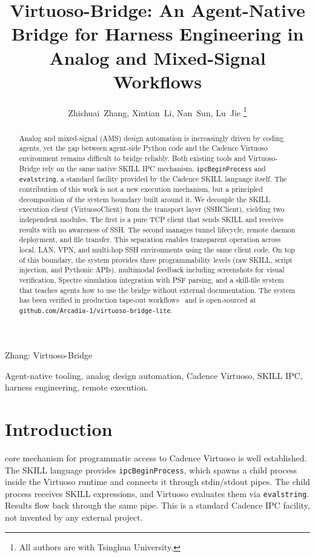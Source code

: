 \documentclass[lettersize,journal]{ieee_template/IEEEtran}
\begin{document}
\title{Virtuoso-Bridge: An Agent-Native Bridge for Harness Engineering in Analog and Mixed-Signal Workflows}

\author{Zhishuai~Zhang, Xintian~Li, Nan~Sun, Lu~Jie%
\thanks{All authors are with Tsinghua University.}%
}

\markboth{}%
{Zhang: Virtuoso-Bridge}

\maketitle

\begin{abstract}
Analog and mixed-signal (AMS) design automation is increasingly driven by coding agents, yet the gap between agent-side Python code and the Cadence Virtuoso environment remains difficult to bridge reliably. Both existing tools and Virtuoso-Bridge rely on the same native SKILL IPC mechanism, \texttt{ipcBeginProcess} and \texttt{evalstring}, a standard facility provided by the Cadence SKILL language itself. The contribution of this work is not a new execution mechanism, but a principled decomposition of the system boundary built around it. We decouple the SKILL execution client (VirtuosoClient) from the transport layer (SSHClient), yielding two independent modules. The first is a pure TCP client that sends SKILL and receives results with no awareness of SSH. The second manages tunnel lifecycle, remote daemon deployment, and file transfer. This separation enables transparent operation across local, LAN, VPN, and multi-hop SSH environments using the same client code. On top of this boundary, the system provides three programmability levels (raw SKILL, script injection, and Pythonic APIs), multimodal feedback including screenshots for visual verification, Spectre simulation integration with PSF parsing, and a skill-file system that teaches agents how to use the bridge without external documentation. The system has been verified in production tape-out workflows~\cite{amsioagent} and is open-sourced at \texttt{github.com/Arcadia-1/virtuoso-bridge-lite}.
\end{abstract}

\begin{IEEEkeywords}
Agent-native tooling, analog design automation, Cadence Virtuoso, SKILL IPC, harness engineering, remote execution.
\end{IEEEkeywords}

\section{Introduction}
 core mechanism for programmatic access to Cadence Virtuoso is well established. The SKILL language provides \texttt{ipcBeginProcess}, which spawns a child process inside the Virtuoso runtime and connects it through stdin/stdout pipes. The child process receives SKILL expressions, and Virtuoso evaluates them via \texttt{evalstring}. Results flow back through the same pipe. This is a standard Cadence IPC facility, not invented by any external project.
\end{document}
